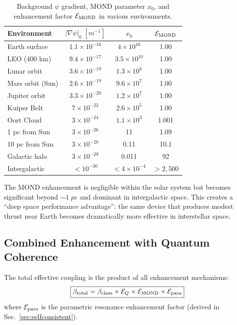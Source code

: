 \documentclass[twocolumn,prl,superscriptaddress,nofootinbib,longbibliography,floatfix]{revtex4-2}
\begin{document}
\begin{table}[h]
\centering
\caption{Background $\psi$ gradient, MOND parameter $x_0$, and
enhancement factor $\mathcal{E}_{\rm MOND}$ in various environments.}
\label{tab:mond-env}
\begin{ruledtabular}
\begin{tabular}{lccc}
Environment & $|\nabla\psi|_0\;[\si{m^{-1}}]$ & $x_0$ &
$\mathcal{E}_{\rm MOND}$ \\
\hline
Earth surface & $1.1 \times 10^{-16}$ & $4 \times 10^{10}$ & 1.00 \\
LEO (400 km) & $9.4 \times 10^{-17}$ & $3.5 \times 10^{10}$ & 1.00 \\
Lunar orbit & $3.6 \times 10^{-19}$ & $1.3 \times 10^{8}$ & 1.00 \\
Mars orbit (Sun) & $2.6 \times 10^{-19}$ & $9.6 \times 10^{7}$ & 1.00 \\
Jupiter orbit & $3.3 \times 10^{-20}$ & $1.2 \times 10^{7}$ & 1.00 \\
Kuiper Belt & $7 \times 10^{-22}$ & $2.6 \times 10^{5}$ & 1.00 \\
Oort Cloud & $3 \times 10^{-24}$ & $1.1 \times 10^{3}$ & 1.001 \\
1 pc from Sun & $3 \times 10^{-26}$ & 11 & 1.09 \\
10 pc from Sun & $3 \times 10^{-28}$ & 0.11 & 10.1 \\
Galactic halo & $3 \times 10^{-29}$ & 0.011 & 92 \\
Intergalactic & $< 10^{-30}$ & $< 4 \times 10^{-4}$ & $> 2{,}500$ \\
\end{tabular}
\end{ruledtabular}
\end{table}

The MOND enhancement is negligible within the solar system but becomes
significant beyond $\sim 1\;\si{pc}$ and dominant in intergalactic space.
This creates a ``deep space performance advantage'': the same device that
produces modest thrust near Earth becomes dramatically more effective in
interstellar space.

\subsection{Combined Enhancement with Quantum Coherence}

The total effective coupling is the product of all enhancement mechanisms:
\begin{equation}
\boxed{
\beta_{\rm total} = \beta_{\rm class} \times \mathcal{E}_Q
\times \mathcal{E}_{\rm MOND} \times \mathcal{E}_{\rm para}
}
\label{eq:beta-total}
\end{equation}
where $\mathcal{E}_{\rm para}$ is the parametric resonance enhancement
factor (derived in Sec.~\ref{sec:selfconsistent}).
\end{document}
